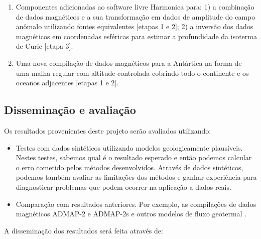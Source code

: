 \documentclass[11pt,a4paper,oneside]{book}
\begin{document}
\begin{enumerate}
  \item Componentes adicionadas ao software livre Harmonica para:
    1) a combinação de dados magnéticos e a sua transformação em dados de
       amplitude do campo anômalo utilizando fontes equivalentes [etapas 1 e
       2];
    2) a inversão dos dados magnéticos em coordenadas esféricas para estimar a
       profundidade da isoterma de Curie [etapa 3].
  \item Uma nova compilação de dados magnéticos para a Antártica na forma de
    uma malha regular com altitude controlada cobrindo todo o continente e os
    oceanos adjacentes [etapas 1 e 2].
\end{enumerate}

\subsection{Disseminação e avaliação}

Os resultados provenientes deste projeto serão avaliados utilizando:

\begin{itemize}
  \item Testes com dados sintéticos utilizando modelos geologicamente
    plausíveis. Nestes testes, sabemos qual é o resultado esperado e então
    podemos calcular o erro cometido pelos métodos desenvolvidos. Através de
    dados sintéticos, podemos também avaliar as limitações dos métodos e ganhar
    experiência para diagnosticar problemas que podem ocorrer na aplicação a
    dados reais.
  \item Comparação com resultados anteriores. Por exemplo, as compilações de
    dados magnéticos ADMAP-2 e ADMAP-2s \citep{Golynsky2018, Kim2022} e outros
    modelos de fluxo geotermal \citep{FoxMaule2005, Losing2021, Losing2020,
    Stal2021}.
\end{itemize}

\noindent
A disseminação dos resultados será feita através de:
\end{document}
